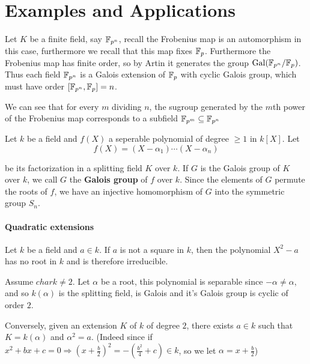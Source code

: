   \section{Examples and Applications}
  \begin{bergman}
    Let $K$ be a finite field, say $\mathbb{F}_{p^n}$, recall the Frobenius map is an automorphism in this case, furthermore we recall that this map fixes $\mathbb{F}_p$. Furthermore the Frobenius map has finite order, so by Artin
    it generates the group $\text{Gal}(\mathbb{F}_{p^n}/\mathbb{F}_{p})$. Thus each field $\mathbb{F}_{p^n}$ is a Galois extension of $\mathbb{F}_{p}$ with cyclic Galois group, which must have order $[\mathbb{F}_{p^n}, \mathbb{F}_{p}] = n$.

    We can see that for every $m$ dividing $n$, the sugroup generated by the $m$th power of the Frobenius map corresponds to a subfield $\mathbb{F}_{p^m}\subseteq \mathbb{F}_{p^n}$ 
  \end{bergman}
  
  \begin{definition}
    Let $k$ be a field and $f(X)$ a seperable polynomial of degree $\geq 1$ in $k[X]$. Let \[
        f(X) = (X-\alpha_1)\cdots (X-\alpha_n)  
    \]

    be its factorization in a splitting field $K$ over $k$. If $G$ is the Galois group of $K$ over $k$, we call $G$ the \textbf{Galois group} of $f$ over $k$. 
    Since the elements of $G$ permute the roots of $f$, we have an injective homomorphism of $G$ into the symmetric group $S_n$. 
  \end{definition}
  \paragraph*{Quadratic extensions}
  \begin{example}
    Let $k$ be a field and $a\in k$. If $a$ is not a square in $k$, then the polynomial $X^2-a$ has no root in $k$ and is therefore irreducible.
  
    Assume $char k\neq 2$. Let $\alpha$ be a root, this polynomial is separable since $-\alpha\neq \alpha$, and so $k(\alpha)$ is the splitting field, is Galois and it's Galois group is cyclic of order $2$.
  
    Conversely, given an extension $K$ of $k$ of degree $2$, there exists $a\in k$ such that $K = k(\alpha)$ and $\alpha^2 = a$. (Indeed since if $x^2 + bx + c = 0\Rightarrow {(x + \frac{b}{2})}^2 = -(\frac{b^2}{4} + c)\in k$, so we let $\alpha = x + \frac{b}{2}$)
  \end{example}


